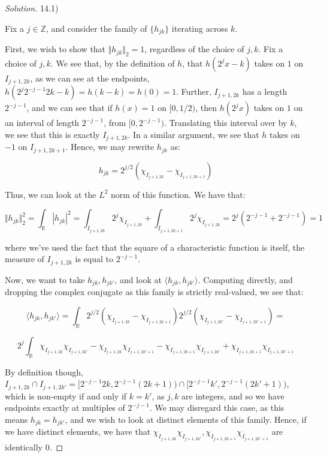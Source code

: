 \documentclass[10pt]{article}
\begin{document}
\begin{proof}[Solution]

14.1)

Fix a $j \in \mathbb{Z}$, and consider the family of $\{ h_{jk} \}$ iterating across $k$.

First, we wish to show that $\Vert h_{jk} \Vert_2 = 1$, regardless of the choice of $j,k$. Fix a choice of $j,k$. We see that, by the definition of $h$, that $h(2^jx - k)$ takes on $1$ on $I_{j+1, 2k}$, as we can see at the endpoints, $h(2^j 2^{-j - 1} 2k - k ) = h(k - k ) = h(0)= 1$. Further, $I_{j+1, 2k}$  has a length $2^{-j-1}$, and we can see that if $h(x) = 1$ on $[0,1/2)$, then $h(2^{j}x)$ takes on $1$ on an interval of length $2^{-j-1}$, from $[0,2^{-j-1})$. Translating this interval over by $k$, we see that this is exactly $I_{j+1, 2k}$. In a similar argument, we see that $h$ takes on $-1$ on $I_{j+1, 2k+1}$. Hence, we may rewrite $h_{jk}$ as:

$$ h_{jk} = 2^{j/2} (\chi_{I_{j+1, 2k}} - \chi_{I_{j+1, 2k+1}} ) $$

Thus, we can look at the $L^2$ norm of this function. We have that:

$$ \Vert h_{jk} \Vert_2^2 = \int_{\mathbb{R}} | h_{jk} | ^2 = \int_{I_{j+1, 2k}} 2^j \chi_{I_{j+1, 2k}} + \int_{I_{j+1, 2k+1}} 2^j \chi_{I_{j+1, 2k}} = 2^j (2^{-j-1}+ 2^{-j-1}) = 1 $$

where we've used the fact that the square of a characteristic function is itself, the measure of $I_{j+1, 2k}$ is equal to $2^{-j-1}$.

Now, we want to take $h_{jk}, h_{jk'}$, and look at $\langle h_{jk}, h_{jk'} \rangle$. Computing directly, and dropping the complex conjugate as this family is strictly real-valued, we see that:

$$ \langle h_{jk}, h_{jk'} \rangle = \int_{\mathbb{R}} 2^{j/2} (\chi_{I_{j+1, 2k}} - \chi_{I_{j+1, 2k+1}} )  2^{j/2} (\chi_{I_{j+1, 2k'}} - \chi_{I_{j+1, 2k'+1}} ) = $$

$$ 2^j \int_{\mathbb{R}}  \chi_{I_{j+1, 2k}}\chi_{I_{j+1, 2k'}} - \chi_{I_{j+1, 2k}} \chi_{I_{j+1, 2k'+1}} - \chi_{I_{j+1, 2k+1}} \chi_{I_{j+1, 2k'}} + \chi_{I_{j+1, 2k+1}} \chi_{I_{j+1, 2k'+1}} $$

By definition though, $I_{j+1, 2k} \cap I_{j+1, 2k'} = [2^{-j-1}2k, 2^{-j-1}(2k+1)) \cap [2^{-j-1}k', 2^{-j-1}(2k'+1))$, which is non-empty if and only if $k = k'$, as $j, k$ are integers, and so we have endpoints exactly at multiples of $2^{-j-1}$. We may disregard this case, as this means $h_{jk} = h_{jk'}$, and we wish to look at distinct elements of this family. Hence, if we have distinct elements, we have that $\chi_{I_{j+1, 2k}}\chi_{I_{j+1, 2k'}}, \chi_{I_{j+1, 2k+1}} \chi_{I_{j+1, 2k'+1}}$ are identically 0.


\end{proof}
\end{document}
